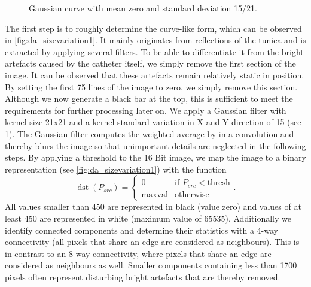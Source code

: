 \begin{figure}
    \centering
    
    \caption[Gaussian curve]{Gaussian curve with mean zero and standard deviation 15/21.}
    \label{fig:gaussiancurve}
\end{figure}
The first step is to roughly determine the curve-like form, which can be observed in \cref{fig:da_sizevariation1}. It mainly originates from reflections of the tunica and is extracted by applying several filters. To be able to differentiate it from the bright artefacts caused by the catheter itself, we simply remove the first section of the image. It can be observed that these artefacts remain relatively static in position. By setting the first 75 lines of the image to zero, we simply remove this section. Although we now generate a black bar at the top, this is sufficient to meet the requirements for further processing later on. We apply a Gaussian filter with kernel size 21x21 and a kernel standard variation in X and Y direction of 15 (see \cref{fig:gaussiancurve}). The Gaussian filter computes the weighted average by in a convolution and thereby blurs the image so that unimportant details are neglected in the following steps. By applying a threshold to the 16 Bit image, we map the image to a binary representation (see \cref{fig:da_sizevariation1}) with the function
\begin{equation}
\operatorname{dst}(P_{src})=
\begin{cases}
0 & \text {if } P_{src} < \text {thresh} \\
\text {maxval} & \text {otherwise}
\end{cases}.
\end{equation}
All values smaller than 450 are represented in black (value zero) and values of at least 450 are represented in white (maximum value of 65535). Additionally we identify connected components and determine their statistics with a 4-way connectivity (all pixels that share an edge are considered as neighbours). This is in contrast to an 8-way connectivity, where pixels that share an edge are considered as neighbours as well. Smaller components containing less than 1700 pixels often represent disturbing bright artefacts that are thereby removed.

